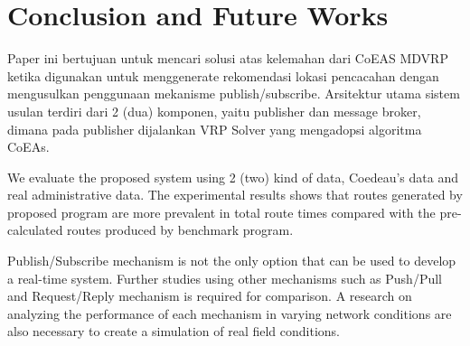 \documentclass[conference]{IEEEtran}
\begin{document}
\section{Conclusion and Future Works}
\label{sec:conclusion-future-works}
Paper ini bertujuan untuk mencari solusi atas kelemahan dari CoEAS MDVRP ketika digunakan untuk menggenerate rekomendasi lokasi pencacahan dengan mengusulkan penggunaan mekanisme publish/subscribe. Arsitektur utama sistem usulan terdiri dari 2 (dua) komponen, yaitu publisher dan message broker, dimana pada publisher dijalankan VRP Solver yang mengadopsi algoritma CoEAs.


We evaluate the proposed system using 2 (two) kind of data, Coedeau's data and real administrative data. The experimental results shows that routes generated by proposed program are more prevalent in total route times compared with the pre-calculated routes produced by benchmark program.


Publish/Subscribe mechanism is not the only option that can be used to develop a real-time system. Further studies using other mechanisms such as Push/Pull and Request/Reply mechanism is required for comparison. A research on analyzing the performance of each mechanism in varying network conditions are also necessary to create a simulation of real field conditions.


%
%
\end{document}
